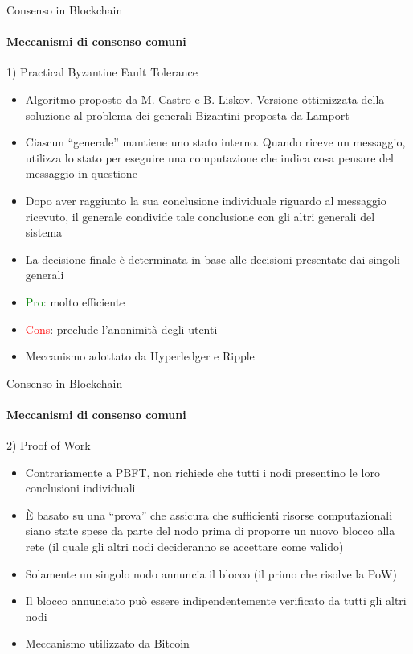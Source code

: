 \documentclass{beamer}
\newcommand\red[1]{\textcolor{red}{#1}}
\begin{document}
  \begin{frame}{Consenso in Blockchain}
    \framesubtitle{Meccanismi di consenso comuni}
    \begin{block}{1) Practical Byzantine Fault Tolerance}
      \begin{itemize}
        \item Algoritmo proposto da M. Castro e B. Liskov. Versione ottimizzata della soluzione al problema dei generali Bizantini proposta da Lamport \cite{castro1999practical} 
        \item Ciascun ``generale'' mantiene uno stato interno. Quando riceve un messaggio, utilizza lo stato per eseguire una computazione che indica cosa pensare del messaggio in questione 
        \item Dopo aver raggiunto la sua conclusione individuale riguardo al messaggio ricevuto, il generale condivide tale conclusione con gli altri generali del sistema
        \item La decisione finale è determinata in base alle decisioni presentate dai singoli generali \pause
        \item \textcolor{green}{Pro}: molto efficiente \pause
        \item \red{Cons}: preclude l'anonimità degli utenti \pause
        \item Meccanismo adottato da Hyperledger e Ripple
      \end{itemize}
    \end{block}
  \end{frame}




  \begin{frame}{Consenso in Blockchain}
    \framesubtitle{Meccanismi di consenso comuni}
    \begin{block}{2) Proof of Work}
      \begin{itemize}
        \item Contrariamente a PBFT, non richiede che tutti i nodi presentino le loro conclusioni individuali 
        \item È basato su una ``prova'' che assicura che sufficienti risorse computazionali siano state spese da parte del nodo prima di proporre un nuovo blocco alla rete (il quale gli altri nodi decideranno se accettare come valido)
        \item Solamente un singolo nodo annuncia il blocco (il primo che risolve la PoW) 
        \item Il blocco annunciato può essere indipendentemente verificato da tutti gli altri nodi \pause
        \item Meccanismo utilizzato da Bitcoin
      \end{itemize}
    \end{block}
  \end{frame}
\end{document}
